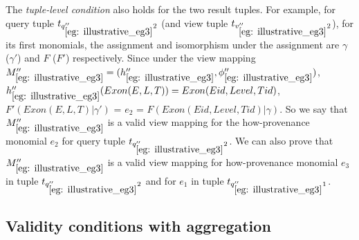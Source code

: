 \begin{example}
The {\em tuple-level condition} also holds for the two result tuples. For example, for query tuple $t_{q_{\ref{eg: illustrative_eg3}}''2}$ (and view tuple $t_{v_{\ref{eg: illustrative_eg3}}''2}$), for its first monomials, the assignment and isomorphism under the assignment are $\gamma$ ($\gamma'$) and $F$ ($F'$) respectively. Since under the view mapping $M_{\ref{eg: illustrative_eg3}}''=(h_{\ref{eg: illustrative_eg3}}'', \phi_{\ref{eg: illustrative_eg3}}'')$, $h_{\ref{eg: illustrative_eg3}}''(Exon(E, L, T)) = Exon(Eid, Level, Tid)$, \\
$F'(Exon(E, L, T)|\gamma')$ = $e_2$ = $F(Exon(Eid, Level, Tid)| \gamma)$. So we say that $M_{\ref{eg: illustrative_eg3}}''$ is a valid view mapping for the how-provenance monomial $e_2$ for query tuple $t_{q_{\ref{eg: illustrative_eg3}}''2}$. We can also prove that $M_{\ref{eg: illustrative_eg3}}''$ is a valid view mapping for how-provenance monomial $e_3$ in tuple $t_{q_{\ref{eg: illustrative_eg3}}''2}$ and for $e_1$ in tuple $t_{q_{\ref{eg: illustrative_eg3}}''1}$.



\end{example}



\subsection{Validity conditions with aggregation}\label{valid_condition_agg}

